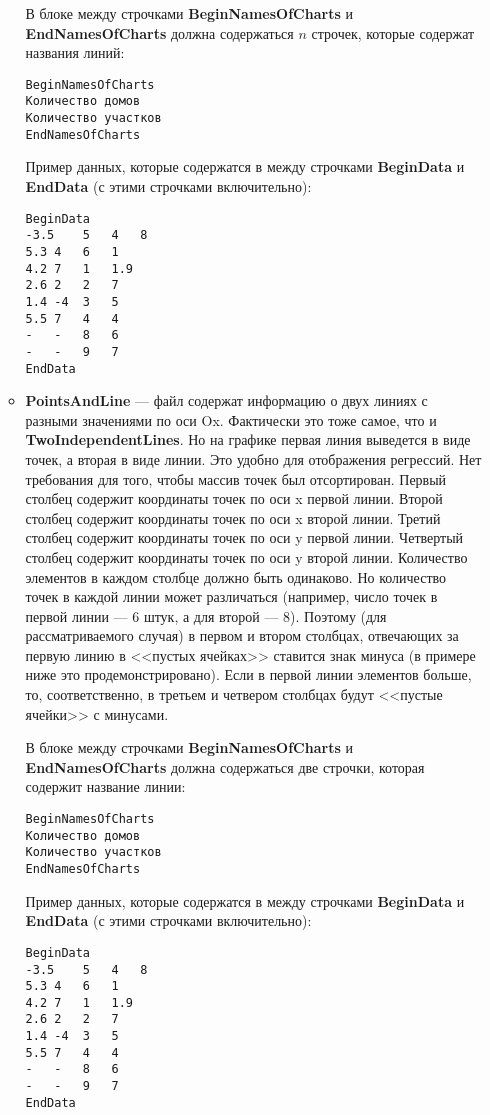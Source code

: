 \documentclass[a4paper,12pt]{article}
\begin{document}
\begin{itemize}
\begin{itemize}
В блоке между строчками \textbf{BeginNamesOfCharts} и \textbf{EndNamesOfCharts} должна содержаться $n$ строчек, которые содержат названия линий:
\begin{lstlisting}[label=Line03_9,caption=Для SeveralIndependentLines ]
BeginNamesOfCharts
Количество домов
Количество участков
EndNamesOfCharts
\end{lstlisting}

Пример данных, которые содержатся в между строчками \textbf{BeginData} и \textbf{EndData} (с этими строчками включительно):
\begin{lstlisting}[label=Line03_10,caption=Для SeveralIndependentLines ]
BeginData
-3.5	5	4	8
5.3	4	6	1
4.2	7	1	1.9
2.6	2	2	7
1.4	-4	3	5
5.5	7	4	4
-	-	8	6
-	-	9	7
EndData
\end{lstlisting}

\item \textbf{PointsAndLine} --- файл содержат информацию о двух линиях с разными значениями по оси Ox. Фактически это тоже самое, что и \textbf{TwoIndependentLines}. Но на графике первая линия выведется в виде точек, а вторая в виде линии. Это удобно для отображения регрессий. Нет требования для того, чтобы массив точек был отсортирован. Первый столбец содержит координаты точек по оси x первой линии. Второй столбец содержит координаты точек по оси x второй линии. Третий столбец содержит координаты точек по оси y первой линии. Четвертый столбец содержит координаты точек по оси y второй линии. Количество элементов в каждом столбце должно быть одинаково. Но количество точек в каждой линии может различаться (например, число точек в первой линии --- 6 штук, а для второй --- 8). Поэтому (для рассматриваемого случая) в первом и втором столбцах, отвечающих за первую линию в <<пустых ячейках>> ставится знак минуса (в примере ниже это продемонстрировано). Если в первой линии элементов больше, то, соответственно, в третьем и четвером столбцах будут  <<пустые ячейки>> с минусами.

В блоке между строчками \textbf{BeginNamesOfCharts} и \textbf{EndNamesOfCharts} должна содержаться две строчки, которая содержит название линии:
\begin{lstlisting}[label=Line03_11,caption=Для PointsAndLine ]
BeginNamesOfCharts
Количество домов
Количество участков
EndNamesOfCharts
\end{lstlisting}

Пример данных, которые содержатся в между строчками \textbf{BeginData} и \textbf{EndData} (с этими строчками включительно):
\begin{lstlisting}[label=Line03_12,caption=Для PointsAndLine ]
BeginData
-3.5	5	4	8
5.3	4	6	1
4.2	7	1	1.9
2.6	2	2	7
1.4	-4	3	5
5.5	7	4	4
-	-	8	6
-	-	9	7
EndData
\end{lstlisting}


\end{itemize}
\end{itemize}
\end{document}
